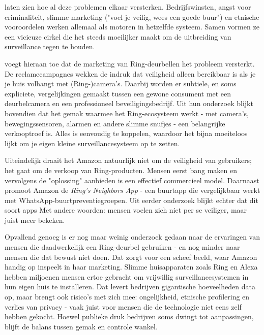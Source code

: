 \documentclass[nonacm, sigconf]{acmart}
\begin{document}
    \noindent \citeauthor{selinger2022amazon} laten zien hoe al deze problemen elkaar versterken.
    Bedrijfswinsten, angst voor criminaliteit, slimme marketing ("voel je veilig, wees een goede buur") en etnische vooroordelen werken allemaal als motoren in hetzelfde systeem.
    Samen vormen ze een vicieuze cirkel die het steeds moeilijker maakt om de uitbreiding van surveillance tegen te houden.

    \noindent \citeauthor{kelly2023ring} voegt hieraan toe dat de marketing van Ring-deurbellen het probleem versterkt.
    De reclamecampagnes wekken de indruk dat veiligheid alleen bereikbaar is als je je huis volhangt met (Ring-)camera's.
    Daarbij worden er subtiele, en soms expliciete, vergelijkingen gemaakt tussen een gewone consument met een deurbelcamera en een professioneel beveiligingsbedrijf.
    Uit hun onderzoek blijkt bovendien dat het gemak waarmee het Ring-ecosysteem werkt - met camera's, bewegingssensoren, alarmen en andere slimme snufjes - een belangrijke verkooptroef is.
    Alles is eenvoudig te koppelen, waardoor het bijna moeiteloos lijkt om je eigen kleine surveillancesysteem op te zetten.

    \noindent Uiteindelijk draait het Amazon natuurlijk niet om de veiligheid van gebruikers; het gaat om de verkoop van Ring-producten.
    Mensen eerst bang maken en vervolgens de "oplossing" aanbieden is een effectief commercieel model.
    Daarnaast promoot Amazon de \textit{Ring's Neighbors App} - een buurtapp die vergelijkbaar werkt met WhatsApp-buurtpreventiegroepen.
    Uit eerder onderzoek blijkt echter dat dit soort apps
    Met andere woorden: mensen voelen zich niet per se veiliger, maar juist meer bekeken.

    \noindent Opvallend genoeg is er nog maar weinig onderzoek gedaan naar de ervaringen van mensen die daadwerkelijk een Ring-deurbel gebruiken - en nog minder naar mensen die dat bewust níet doen.
    Dat zorgt voor een scheef beeld, waar Amazon handig op inspeelt in haar marketing.
    Slimme huisapparaten zoals Ring en Alexa hebben miljoenen mensen ertoe gebracht om vrijwillig surveillancesystemen in hun eigen huis te installeren.
    Dat levert bedrijven gigantische hoeveelheden data op, maar brengt ook risico's met zich mee: ongelijkheid, etnische profilering en verlies van privacy - vaak juist voor mensen die de technologie niet eens zelf hebben gekocht.
    Hoewel publieke druk bedrijven soms dwingt tot aanpassingen, blijft de balans tussen gemak en controle wankel.
\end{document}
